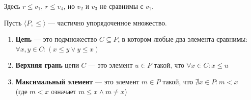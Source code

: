 \documentclass[11pt, a4paper]{extarticle}
\renewcommand{\le}{\leqslant}
\begin{document}
\begin{example}
\begin{enumerate}
    Здесь $r \le v_1$, $r \le v_4$, но $v_2$ и $v_3$ не сравнимы с $v_1$.
\end{enumerate}
\end{example}

\begin{definition}
Пусть $\langle P, \le \rangle$ --- частично упорядоченное множество.
\begin{enumerate}
    \item \textbf{Цепь} --- это подмножество $C \subseteq P$, в котором любые два элемента сравнимы: $\forall x, y \in C: (x \le y \lor y \le x)$
    \item \textbf{Верхняя грань} цепи $C$ --- это элемент $u \in P$ такой, что $\forall x \in C: x \le u$
    \item \textbf{Максимальный элемент} --- это элемент $m \in P$ такой, что $\nexists x \in P: m < x$ (где $m < x$ означает $m \le x \land m \neq x$)
\end{enumerate}
\end{definition}
\end{document}
